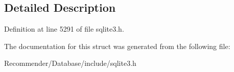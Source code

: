 \subsection{Detailed Description}




Definition at line 5291 of file sqlite3.h.

The documentation for this struct was generated from the following file:\begin{CompactItemize}
\item 
Recommender/Database/include/sqlite3.h\end{CompactItemize}
